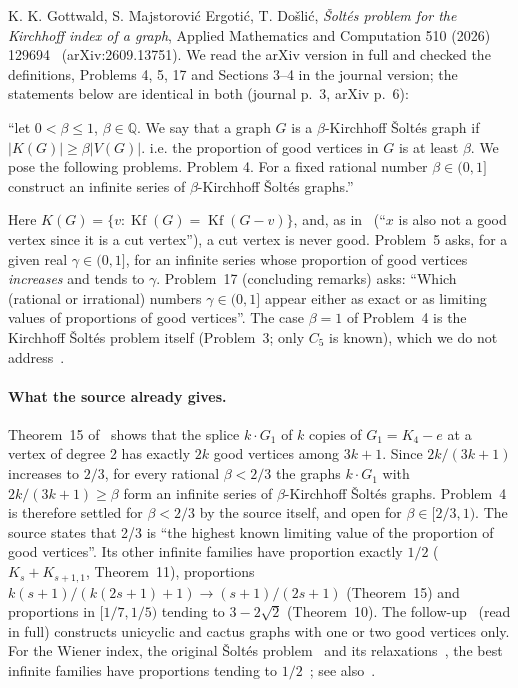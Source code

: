 \documentclass[11pt,a4paper]{report}
\newcommand*{\Kf}{\operatorname{Kf}}
\begin{document}
K. K. Gottwald, S. Majstorović Ergotić, T. Došlić, \emph{Šoltés problem for the Kirchhoff index of a graph}, Applied
Mathematics and Computation 510 (2026) 129694~\autocite{GMD2026} (arXiv:2609.13751). We read the arXiv version in full
and checked the definitions, Problems 4, 5, 17 and Sections 3--4 in the journal version; the statements below are
identical in both (journal p.~3, arXiv p.~6):
\begin{openquote}
``let \(0<\beta\le1\), \(\beta\in\mathbb Q\). We say that a graph \(G\) is a \(\beta\)-Kirchhoff Šoltés graph if
\(|K(G)|\ge\beta|V(G)|\). i.e. the proportion of good vertices in \(G\) is at least \(\beta\). We pose the following
problems. Problem 4. For a fixed rational number \(\beta\in(0,1]\) construct an infinite series of \(\beta\)-Kirchhoff
Šoltés graphs.''
\end{openquote}
Here \(K(G)=\{v:\Kf(G)=\Kf(G-v)\}\), and, as in~\autocite{GMD2026} (``\(x\) is also not a good vertex since it is a
cut vertex''), a cut vertex is never good. Problem~5 asks, for a given real \(\gamma\in(0,1]\), for an infinite series
whose proportion of good vertices \emph{increases} and tends to \(\gamma\). Problem~17 (concluding remarks) asks:
``Which (rational or irrational) numbers \(\gamma\in(0,1]\) appear either as exact or as limiting values of proportions
of good vertices''. The case \(\beta=1\) of Problem~4 is the Kirchhoff Šoltés problem itself (Problem~3; only \(C_5\) is
known), which we do not address~\autocite{SiblingKS}.

\paragraph{What the source already gives.} Theorem~15 of~\autocite{GMD2026} shows that the splice \(k\cdot G_{1}\) of
\(k\) copies of \(G_1=K_4-e\) at a vertex of degree 2 has exactly \(2k\) good vertices among \(3k+1\). Since
\(2k/(3k+1)\) increases to \(2/3\), for every rational \(\beta<2/3\) the graphs \(k\cdot G_1\) with
\(2k/(3k+1)\ge\beta\) form an infinite series of \(\beta\)-Kirchhoff Šoltés graphs. Problem~4 is therefore settled for
\(\beta<2/3\) by the source itself, and open for \(\beta\in[2/3,1)\). The source states that 2/3 is ``the highest known
limiting value of the proportion of good vertices''. Its other infinite families have proportion exactly \(1/2\)
(\(K_s+K_{s+1,1}\), Theorem~11), proportions \(k(s+1)/(k(2s+1)+1)\to(s+1)/(2s+1)\) (Theorem~15) and proportions in
\([1/7,1/5)\) tending to \(3-2\sqrt2\) (Theorem~10). The follow-up~\autocite{MG2025} (read in
full) constructs unicyclic and cactus graphs with one or two good vertices only. For the Wiener index, the original
Šoltés problem~\autocite{Soltes1991} and its relaxations~\autocite{KMS2018,BJM2021,BKS2023}, the best infinite families
have proportions tending to \(1/2\)~\autocite{Akh2023,DV2023}; see also~\autocite{Cambie2024}.
\end{document}
